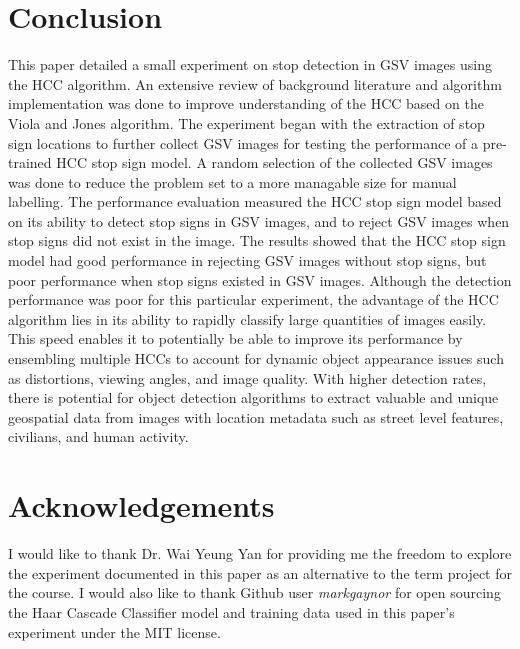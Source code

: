 \section{Conclusion} \label{conclusion}

This paper detailed a small experiment on stop detection in GSV images using the HCC algorithm. An extensive review of background literature and algorithm implementation was done to improve understanding of the HCC based on the Viola and Jones algorithm. The experiment began with the extraction of stop sign locations to further collect GSV images for testing the performance of a pre-trained HCC stop sign model. A random selection of the collected GSV images was done to reduce the problem set to a more managable size for manual labelling. The performance evaluation measured the HCC stop sign model based on its ability to detect stop signs in GSV images, and to reject GSV images when stop signs did not exist in the image. The results showed that the HCC stop sign model had good performance in rejecting GSV images without stop signs, but poor performance when stop signs existed in GSV images. Although the detection performance was poor for this particular experiment, the advantage of the HCC algorithm lies in its ability to rapidly classify large quantities of images easily. This speed enables it to potentially be able to improve its performance by ensembling multiple HCCs to account for dynamic object appearance issues such as distortions, viewing angles, and image quality. With higher detection rates, there is potential for object detection algorithms to extract valuable and unique geospatial data from images with location metadata such as street level features, civilians, and human activity.


\section*{Acknowledgements}

I would like to thank Dr. Wai Yeung Yan for providing me the freedom to explore the experiment documented in this paper as an alternative to the term project for the course. I would also like to thank Github user \textit{markgaynor} for open sourcing the Haar Cascade Classifier model and training data used in this paper's experiment under the MIT license.




